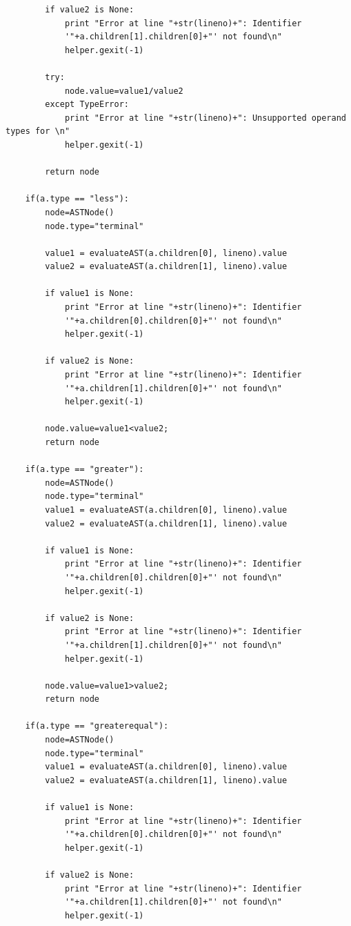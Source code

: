 \documentclass[a4paper]{article}
\begin{document}
\begin{verbatim}
        if value2 is None:
            print "Error at line "+str(lineno)+": Identifier 
            '"+a.children[1].children[0]+"' not found\n"
            helper.gexit(-1)

        try:
            node.value=value1/value2
        except TypeError:
            print "Error at line "+str(lineno)+": Unsupported operand types for \n"
            helper.gexit(-1)

        return node

    if(a.type == "less"):
        node=ASTNode()
        node.type="terminal"

        value1 = evaluateAST(a.children[0], lineno).value
        value2 = evaluateAST(a.children[1], lineno).value

        if value1 is None:
            print "Error at line "+str(lineno)+": Identifier 
            '"+a.children[0].children[0]+"' not found\n"
            helper.gexit(-1)
            
        if value2 is None:
            print "Error at line "+str(lineno)+": Identifier 
            '"+a.children[1].children[0]+"' not found\n"
            helper.gexit(-1)

        node.value=value1<value2;
        return node

    if(a.type == "greater"):
        node=ASTNode()
        node.type="terminal"
        value1 = evaluateAST(a.children[0], lineno).value
        value2 = evaluateAST(a.children[1], lineno).value

        if value1 is None:
            print "Error at line "+str(lineno)+": Identifier 
            '"+a.children[0].children[0]+"' not found\n"
            helper.gexit(-1)
            
        if value2 is None:
            print "Error at line "+str(lineno)+": Identifier 
            '"+a.children[1].children[0]+"' not found\n"
            helper.gexit(-1)

        node.value=value1>value2;
        return node

    if(a.type == "greaterequal"):
        node=ASTNode()
        node.type="terminal"
        value1 = evaluateAST(a.children[0], lineno).value
        value2 = evaluateAST(a.children[1], lineno).value

        if value1 is None:
            print "Error at line "+str(lineno)+": Identifier 
            '"+a.children[0].children[0]+"' not found\n"
            helper.gexit(-1)
            
        if value2 is None:
            print "Error at line "+str(lineno)+": Identifier 
            '"+a.children[1].children[0]+"' not found\n"
            helper.gexit(-1)


\end{verbatim}
\end{document}
